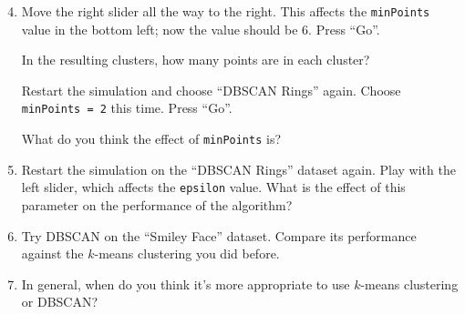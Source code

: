 \documentclass[11pt]{article}
\newcommand{\kmc}{$k$-means clustering}
\begin{document}
\begin{enumerate}
  \setcounter{enumi}{3}
  \item
    Move the right slider all the way to the right. This affects the
    \texttt{minPoints} value in the bottom left; now the value should be
    $6$. Press ``Go''.
    
    In the resulting clusters, how many points are in each cluster?

    Restart the simulation and choose ``DBSCAN Rings'' again. Choose
    \texttt{minPoints = 2} this time. Press ``Go''.

    What do you think the effect of \texttt{minPoints} is?

    \vspace{4em}

  \item
    Restart the simulation on the ``DBSCAN Rings'' dataset again. Play with the
    left slider, which affects the \texttt{epsilon} value. What is the effect of
    this parameter on the performance of the algorithm?

    \vspace{4em}

  \item
    Try DBSCAN on the ``Smiley Face'' dataset.
    Compare its performance against the \kmc{} you did before.

    \vspace{4em}

  \item
    In general, when do you think it's more appropriate to use \kmc{} or DBSCAN?

    \vspace{4em}
\end{enumerate}
\end{document}
